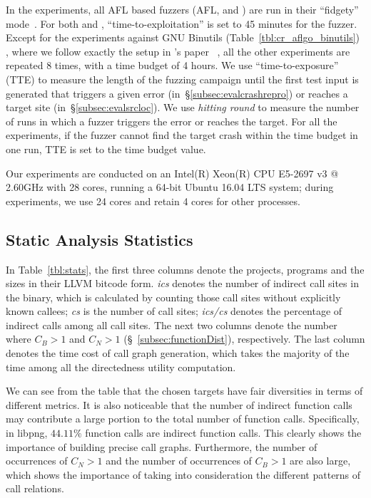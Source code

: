 In the experiments, all AFL based fuzzers (AFL, {\aflgo} and {\dGO}) are run in their ``fidgety'' mode~\cite{FidgetyAFL}. For both {\aflgo} and {\dGO}, ``time-to-exploitation'' is set to 45 minutes for the fuzzer. Except for the experiments against GNU Binutils (Table~\ref{tbl:cr_aflgo_binutils}) , where we follow exactly the setup in {\aflgo}'s paper~\cite{Bohme:2017:DGF} , all the other experiments are repeated 8 times, with a time budget of 4 hours. 
We use ``time-to-exposure'' (TTE) to measure the length of the
fuzzing campaign until the first test input is generated that triggers a given error (in~\S\ref{subsec:evalcrashrepro}) or reaches a target site (in~\S\ref{subsec:evalsrcloc}).
We use \emph{hitting round} to measure the number of runs in which a fuzzer triggers the error or reaches the target.
For all the experiments, if the fuzzer cannot find the target crash within the time budget in one run, TTE is set to the time budget value. 

Our experiments are conducted on an Intel(R) Xeon(R) CPU E5-2697 v3 @ 2.60GHz with 28 cores, running a 64-bit Ubuntu 16.04 LTS system; during experiments, we use 24 cores and retain 4 cores for other processes. 


\subsection{Static Analysis Statistics}\label{subsec:evalstatic}


In Table~\ref{tbl:stats}, the first three columns denote the projects, programs and the sizes in their LLVM bitcode form. \emph{ics} denotes the number of indirect call sites in the binary, which is calculated by counting those call sites without explicitly known callees; \emph{cs} is the number of call sites; \emph{ics/cs} denotes the percentage of indirect calls among all call sites. 
The next two columns denote the number where $C_B>1$ and $C_N>1$ (\S~\ref{subsec:functionDist}), respectively. The last column denotes the time cost of call graph generation, which takes the majority of the time among all the directedness utility computation.



We can see from  the table that the chosen targets have fair diversities in terms of different metrics.
It is also noticeable that the number of indirect function calls may contribute a large portion to the total number of function calls.
Specifically, in libpng, $44.11\%$ function calls are indirect function calls.
This clearly shows the importance of building precise call graphs.
Furthermore, the number of occurrences of $C_N>1$ and the number of occurrences of $C_B>1$ are also large, which shows the importance of taking into consideration the different patterns of call relations.




